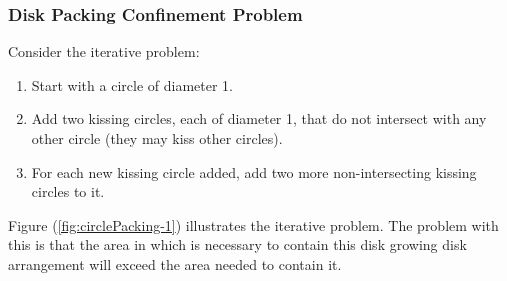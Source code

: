 \subsubsection{Disk Packing Confinement Problem}
Consider the iterative problem:
\begin{enumerate}%
\item Start with a circle of diameter 1.
\item Add two kissing circles, each of diameter 1, that do not intersect with any other circle (they 
may kiss other
circles).
\item For each new kissing circle added, add two more non-intersecting kissing circles to it.
\end{enumerate} 
Figure (\ref{fig:circlePacking-1}) illustrates the iterative problem.  The problem with this is that 
the area in
which is necessary to contain this disk growing disk arrangement will exceed the area needed to 
contain it.
